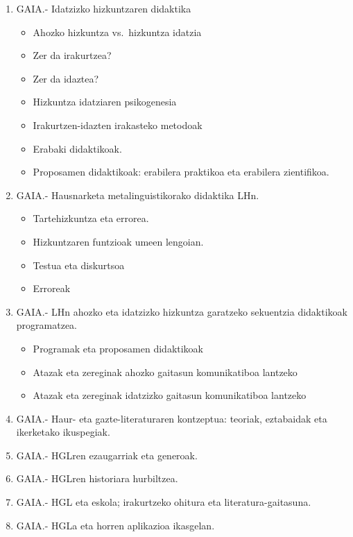 \documentclass[
]{book}
\providecommand{\tightlist}{%
  \setlength{\itemsep}{0pt}\setlength{\parskip}{0pt}}
\begin{document}
\begin{enumerate}
\def\labelenumi{\arabic{enumi}.}
\setcounter{enumi}{2}
\tightlist
\item
  GAIA.- Idatzizko hizkuntzaren didaktika

  \begin{itemize}
  \tightlist
  \item
    Ahozko hizkuntza vs.~hizkuntza idatzia
  \item
    Zer da irakurtzea?
  \item
    Zer da idaztea?
  \item
    Hizkuntza idatziaren psikogenesia
  \item
    Irakurtzen-idazten irakasteko metodoak
  \item
    Erabaki didaktikoak.
  \item
    Proposamen didaktikoak: erabilera praktikoa eta erabilera zientifikoa.\\
  \end{itemize}
\item
  GAIA.- Hausnarketa metalinguistikorako didaktika LHn.

  \begin{itemize}
  \tightlist
  \item
    Tartehizkuntza eta errorea.
  \item
    Hizkuntzaren funtzioak umeen lengoian.
  \item
    Testua eta diskurtsoa
  \item
    Erroreak\\
  \end{itemize}
\item
  GAIA.- LHn ahozko eta idatzizko hizkuntza garatzeko sekuentzia didaktikoak programatzea.

  \begin{itemize}
  \tightlist
  \item
    Programak eta proposamen didaktikoak
  \item
    Atazak eta zereginak ahozko gaitasun komunikatiboa lantzeko
  \item
    Atazak eta zereginak idatzizko gaitasun komunikatiboa lantzeko\\
  \end{itemize}
\item
  GAIA.- Haur- eta gazte-literaturaren kontzeptua: teoriak, eztabaidak eta ikerketako ikuspegiak.
\item
  GAIA.- HGLren ezaugarriak eta generoak.
\item
  GAIA.- HGLren historiara hurbiltzea.
\item
  GAIA.- HGL eta eskola; irakurtzeko ohitura eta literatura-gaitasuna.
\item
  GAIA.- HGLa eta horren aplikazioa ikasgelan.
\end{enumerate}
\end{document}
